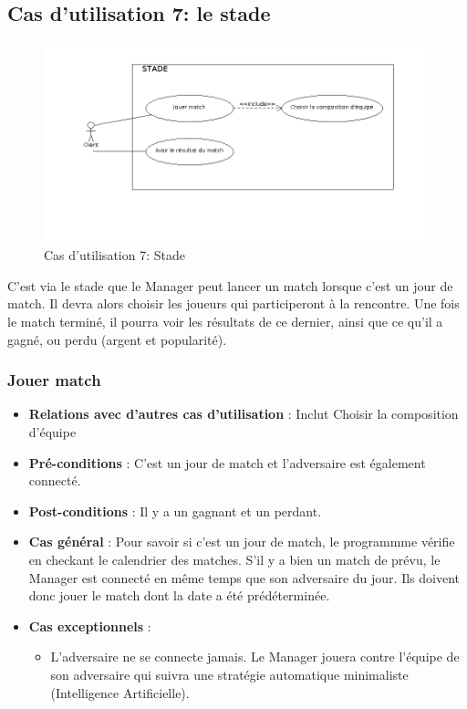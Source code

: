 \documentclass[a4paper,titlepage]{scrreprt}
\begin{document}
  \subsection{Cas d'utilisation 7: le stade}
  \begin{figure}[H]
    \center
    \includegraphics[scale=0.5]{uml/useCaseView/Stade.png}
    \caption{Cas d'utilisation 7: Stade}
  \end{figure}
  C'est via le \gls{stade}  que le Manager peut lancer un match lorsque c'est un jour de match. Il devra alors choisir les joueurs qui participeront à la rencontre. Une fois le match terminé, il pourra voir les résultats de ce dernier, ainsi que ce qu'il a gagné, ou perdu (argent et popularité).
    \subsubsection{Jouer match}
      \begin{itemize}
        \item \textbf{Relations avec d'autres cas d'utilisation}  : Inclut Choisir la composition d’équipe
        \item \textbf{Pré-conditions} : C’est un jour de match et l’adversaire est également connecté.
        \item \textbf{Post-conditions} : Il y a un gagnant et un perdant.
        \item \textbf{Cas général} : Pour savoir si c'est un jour de match, le programmme vérifie en checkant le \gls{calendrier}  des matches. S'il y a bien un match de prévu, le Manager est connecté en même temps que son adversaire du jour. Ils doivent donc jouer le match dont la date a été prédéterminée.
        \item \textbf{Cas exceptionnels} : 
          \begin{itemize}
            \item L’adversaire ne se connecte jamais. Le Manager jouera contre l’équipe de son adversaire qui suivra une stratégie automatique minimaliste (Intelligence Artificielle).
          \end{itemize}
      \end{itemize}
\end{document}
